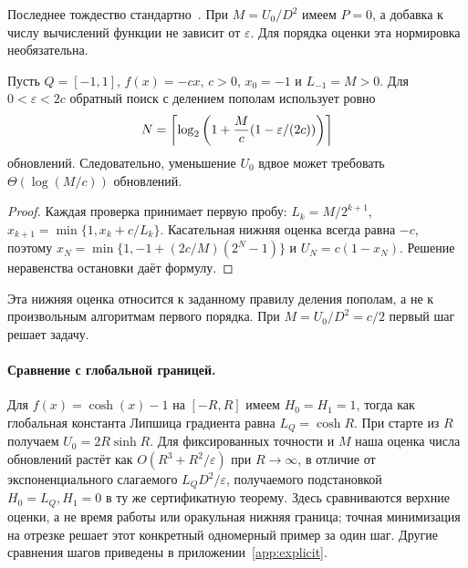 Последнее тождество стандартно~\cite{pedregosa}. При $M=U_0/D^2$
имеем $P=0$, а добавка к числу вычислений функции не зависит от
$\varepsilon$. Для порядка оценки эта нормировка необязательна.

\begin{proposition}
\label{prop:init}
Пусть $Q=[-1,1]$, $f(x)=-cx$, $c>0$, $x_0=-1$ и $L_{-1}=M>0$.
Для $0<\varepsilon<2c$ обратный поиск с делением пополам использует
ровно
\[
 N=\left\lceil\log_2\left(1+\frac Mc(1-\varepsilon/(2c))\right)\right\rceil
\]
обновлений. Следовательно, уменьшение $U_0$ вдвое может требовать
$\Theta(\log(M/c))$ обновлений.
\end{proposition}
\begin{proof}
Каждая проверка принимает первую пробу: $L_k=M/2^{k+1}$,
$x_{k+1}=\min\{1,x_k+c/L_k\}$. Касательная нижняя оценка всегда
равна $-c$, поэтому $x_N=\min\{1,-1+(2c/M)(2^N-1)\}$ и
$U_N=c(1-x_N)$. Решение неравенства остановки даёт формулу.
\end{proof}
Эта нижняя оценка относится к заданному правилу деления пополам,
а не к произвольным алгоритмам первого порядка.
При $M=U_0/D^2=c/2$ первый шаг решает задачу.

\paragraph{Сравнение с глобальной границей.}
Для $f(x)=\cosh(x)-1$ на $[-R,R]$ имеем $H_0=H_1=1$, тогда как
глобальная константа Липшица градиента равна $L_Q=\cosh R$.
При старте из $R$ получаем $U_0=2R\sinh R$. Для фиксированных
точности и $M$ наша оценка числа обновлений растёт как
$O(R^3+R^2/\varepsilon)$ при $R\to\infty$, в отличие от
экспоненциального слагаемого $L_QD^2/\varepsilon$, получаемого
подстановкой $H_0=L_Q,H_1=0$ в ту же сертификатную теорему.
Здесь сравниваются верхние оценки, а не время работы или оракульная
нижняя граница; точная минимизация на отрезке решает этот конкретный
одномерный пример за один шаг. Другие сравнения шагов приведены в
приложении~\ref{app:explicit}.
